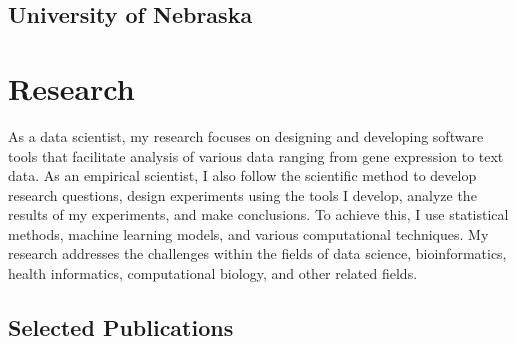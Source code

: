 \documentclass[11pt,a4paper]{moderncv}
\begin{document}
\subsection{\textbf{University of Nebraska}}





\vspace{1.0cm}
\section{\textbf{Research}} %
\vspace{-.4cm}


As a data scientist, my research focuses on designing and developing software tools that facilitate analysis of various data ranging from gene expression to text data. As an empirical scientist, I also follow the scientific method to develop research questions, design experiments using the tools I develop, analyze the results of my experiments, and make conclusions. To achieve this, I use statistical methods, machine learning models, and various computational techniques.  My research addresses the challenges within the fields of data science,  bioinformatics, health informatics,  computational biology, and other related fields. 

\subsection{\textbf{Selected Publications}}
\vspace{-.4cm}



\end{document}
